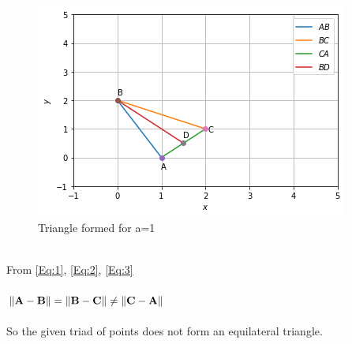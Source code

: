 \documentclass[journal,12pt,twocolumn]{IEEEtran}
\begin{document}
\begin{figure}[!ht]
   \centering
   \includegraphics[width=\columnwidth]{tri.png}
   \caption{Triangle formed for a=1}
   
\end{figure}\\
From {\eqref{Eq:1}}, {\eqref{Eq:2}}, {\eqref{Eq:3}}\\\\
$\lVert \mathbf{A} - \mathbf{B}\rVert = \lVert \mathbf{B} - \mathbf{C}\rVert  \neq \lVert \mathbf{C} - \mathbf{A}\rVert $ \\\\
So the given triad of points does not form an equilateral triangle.
\end{document}
